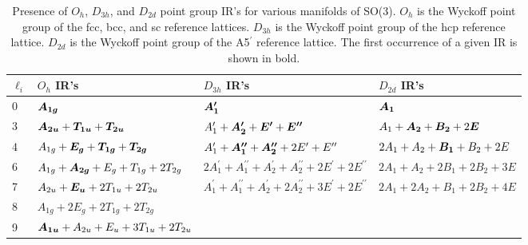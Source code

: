 \documentclass[preprint]{iucr}              %
\newcommand{\mb}[1]{\ensuremath{\mbox{\boldmath $ #1 $}}}
\begin{document}
\begin{table}
\caption{Presence of $O_h$, $D_{3h}$, and $D_{2d}$ point group IR's for various
manifolds of SO(3). $O_h$ is the Wyckoff point group of the fcc,
bcc, and sc reference lattices. $D_{3h}$ is the Wyckoff point group
of the hcp reference lattice. $D_{2d}$ is the Wyckoff point group
of the A5$^\prime$ reference lattice. The first occurrence of a given IR is
shown in bold.}\label{wyckoff_IRs}\small
\begin{tabular}{llll}\hline
$\ell_i$ & $O_h$ IR's &  $D_{3h}$ IR's &  $D_{2d}$ IR's\\
\hline
0 & $\mb{A_{1g}}$ & $\mb{A^\prime_1}$ & $\mb{A_1}$ \\
3 & $\mb{A_{2u}}+\mb{T_{1u}}+\mb{T_{2u}}$ & $A^\prime_1+\mb{A^{\prime}_2}+\mb{E^\prime}+\mb{E^{\prime\prime}}$ & $A_1+\mb{A_2}+\mb{B_2}+2\mb{E}$\\
4 & $A_{1g}+\mb{E_{g}}+\mb{T_{1g}}+\mb{T_{2g}}$ & $A^\prime_1+\mb{A^{\prime\prime}_1}+\mb{A^{\prime\prime}_2}+2E^\prime+E^{\prime\prime}$ & $2A_1+A_2+\mb{B_1}+B_2+2E$\\
6 & $A_{1g}+\mb{A_{2g}}+E_g+T_{1g}+2T_{2g}$ & $2A^\prime_1+A^{\prime\prime}_1+A^{\prime}_2+A^{\prime\prime}_2+2E^\prime+2E^{\prime\prime}$ & $2A_1+A_2+2B_1+2B_2+3E$\\
7 & $A_{2u}+\mb{E_u}+2T_{1u}+2T_{2u}$ & $A^\prime_1+A^{\prime\prime}_1+A^{\prime}_2+2A^{\prime\prime}_2+3E^\prime+2E^{\prime\prime}$ & $2A_1+2A_2+B_1+2B_2+4E$\\
8 & $A_{1g}+2E_g+2T_{1g}+2T_{2g}$ & \\
9 & $\mb{A_{1u}}+A_{2u}+E_u+3T_{1u}+2T_{2u}$ & \\
\hline
\end{tabular}
\end{table}
\end{document}

